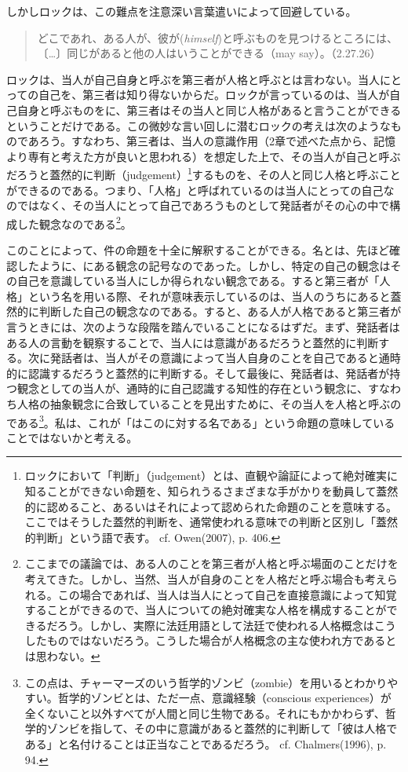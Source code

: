 \documentclass[a4j,oneside]{jsbook}
\begin{document}
\par
しかしロックは、この難点を注意深い言葉遣いによって回避している。
\begin{quote}
どこであれ、ある人が、彼が({\itshape himself})と呼ぶものを見つけるところには、〔…〕同じがあると他の人はいうことができる（may say）。（2.27.26）
\end{quote}
ロックは、当人が自己自身と呼ぶを第三者が人格と呼ぶとは言わない。当人にとっての自己を、第三者は知り得ないからだ。ロックが言っているのは、当人が自己自身と呼ぶものをに、第三者はその当人と同じ人格があると言うことができるということだけである。この微妙な言い回しに潜むロックの考えは次のようなものであろう。すなわち、第三者は、当人の意識作用（2章で述べた点から、記憶より専有と考えた方が良いと思われる）を想定した上で、その当人が自己と呼ぶだろうと蓋然的に判断（judgement）\footnote{ロックにおいて「判断」（judgement）とは、直観や論証によって絶対確実に知ることができない命題を、知られうるさまざまな手がかりを動員して蓋然的に認めること、あるいはそれによって認められた命題のことを意味する。ここではそうした蓋然的判断を、通常使われる意味での判断と区別し「蓋然的判断」という語で表す。 cf. Owen(2007), p. 406.}するものを、その人と同じ人格と呼ぶことができるのである。つまり、「人格」と呼ばれているのは当人にとっての自己なのではなく、その当人にとって自己であろうものとして発話者がその心の中で構成した観念なのである\footnote{ここまでの議論では、ある人のことを第三者が人格と呼ぶ場面のことだけを考えてきた。しかし、当然、当人が自身のことを人格だと呼ぶ場合も考えられる。この場合であれば、当人は当人にとって自己を直接意識によって知覚することができるので、当人についての絶対確実な人格を構成することができるだろう。しかし、実際に法廷用語として法廷で使われる人格概念はこうしたものではないだろう。こうした場合が人格概念の主な使われ方であるとは思わない。}。
\par
このことによって、件の命題を十全に解釈することができる。名とは、先ほど確認したように、にある観念の記号なのであった。しかし、特定の自己の観念はその自己を意識している当人にしか得られない観念である。すると第三者が「人格」という名を用いる際、それが意味表示しているのは、当人のうちにあると蓋然的に判断した自己の観念なのである。すると、ある人が人格であると第三者が言うときには、次のような段階を踏んでいることになるはずだ。まず、発話者はある人の言動を観察することで、当人には意識があるだろうと蓋然的に判断する。次に発話者は、当人がその意識によって当人自身のことを自己であると通時的に認識するだろうと蓋然的に判断する。そして最後に、発話者は、発話者が持つ観念としての当人が、通時的に自己認識する知性的存在という観念に、すなわち人格の抽象観念に合致していることを見出すために、その当人を人格と呼ぶのである\footnote{この点は、チャーマーズのいう哲学的ゾンビ（zombie）を用いるとわかりやすい。哲学的ゾンビとは、ただ一点、意識経験（conscious experiences）が全くないこと以外すべてが人間と同じ生物である。それにもかかわらず、哲学的ゾンビを指して、その中に意識があると蓋然的に判断して「彼は人格である」と名付けることは正当なことであるだろう。 cf. Chalmers(1996), p. 94.}。私は、これが「はこのに対する名である」という命題の意味していることではないかと考える。
\end{document}
